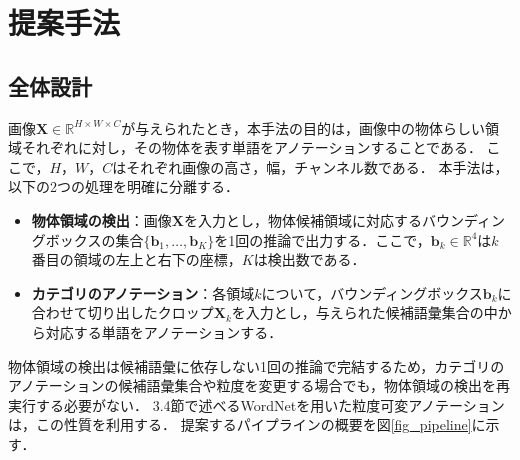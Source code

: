 \section{提案手法}
\subsection{全体設計}
画像$ {\mathbf X} \in {\mathbb R}^{H \times W \times C} $が与えられたとき，本手法の目的は，画像中の物体らしい領域それぞれに対し，その物体を表す単語をアノテーションすることである．
ここで，$ H $，$ W $，$ C $はそれぞれ画像の高さ，幅，チャンネル数である．
本手法は，以下の2つの処理を明確に分離する．

\begin{itemize}
    \item {\bf 物体領域の検出}：画像$ {\mathbf X} $を入力とし，物体候補領域に対応するバウンディングボックスの集合$ \{ {\mathbf b}_1, \ldots, {\mathbf b}_K \} $を1回の推論で出力する．ここで，$ {\mathbf b}_k \in {\mathbb R}^4 $は$ k $番目の領域の左上と右下の座標，$ K $は検出数である．
    \item {\bf カテゴリのアノテーション}：各領域$ k $について，バウンディングボックス$ {\mathbf b}_k $に合わせて切り出したクロップ$ {\mathbf X}_k $を入力とし，与えられた候補語彙集合の中から対応する単語をアノテーションする．
\end{itemize}

物体領域の検出は候補語彙に依存しない1回の推論で完結するため，カテゴリのアノテーションの候補語彙集合や粒度を変更する場合でも，物体領域の検出を再実行する必要がない．
3.4節で述べるWordNetを用いた粒度可変アノテーションは，この性質を利用する．
提案するパイプラインの概要を図\ref{fig_pipeline}に示す．

